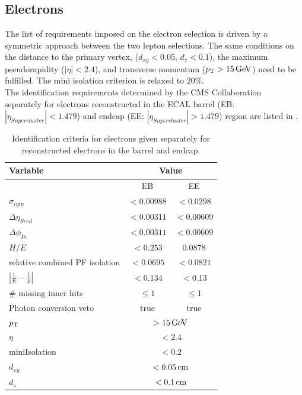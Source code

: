 \subsection{Electrons}
The list of requirements imposed on the electron selection is driven by a symmetric approach between the two lepton selections. The same conditions on the distance to the primary vertex, ($d_{xy}<0.05$, $d_z<0.1$), the maximum pseudorapidity ($|\eta|<2.4$), and transverse momentum ($p_{\mathrm{T}}>15\,\text{Ge\hspace{-.08em}V}$) need to be fulfilled. The mini isolation criterion is relaxed to $20\%$.\\
The identification requirements determined by the CMS Collaboration~\cite{ElectronID} separately for electrons reconstructed in the ECAL barrel (EB: $|\eta_{Supercluster}|<1.479$) and endcap (EE: $|\eta_{Supercluster}|>1.479$) region are listed in .
\begin{table}[tbp]
 \centering
 \caption{Identification criteria for electrons given separately for reconstructed electrons in the barrel and endcap.}
 \label{tab:eleID}
 \begin{tabular}{lcc}
  Variable                       & \multicolumn{2}{c}{Value}                   \\\hline
                                 & EB                             & EE         \\\hline
  $\sigma_{i\eta i\eta}$         & $<0.00988$                     & $<0.0298$  \\
  $\Delta\eta_{Seed}$            & $<0.00311$                     & $<0.00609$ \\
  $\Delta\phi_{In}$              & $<0.00311$                     & $<0.00609$ \\
  $H/E$                          & $<0.253$                       & $0.0878$   \\
  relative combined PF isolation & $<0.0695$                      & $<0.0821$  \\
  $|\frac{1}{E}-\frac{1}{p}|$    & $<0.134$                       & $<0.13$    \\
  \# missing inner hits          & $\leq1$                        & $\leq1$    \\
  Photon conversion veto         & true                           & true       \\\hline
  $p_{\mathrm{T}}$                          & \multicolumn{2}{c}{$>15\,\text{Ge\hspace{-.08em}V}$}               \\
  $\eta$                         & \multicolumn{2}{c}{$<2.4$}                  \\
  miniIsolation                  & \multicolumn{2}{c}{$<0.2$}                  \\
  $d_{xy}$                       & \multicolumn{2}{c}{$<0.05\,\text{cm}$}              \\
  $d_z$                          & \multicolumn{2}{c}{$<0.1\,\text{cm}$}               \\\hline
 \end{tabular}
\end{table}
